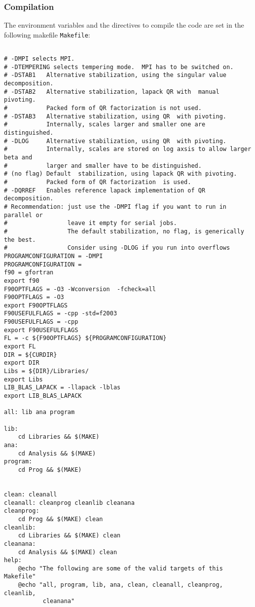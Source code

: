 \subsubsection{Compilation}
\label{sec:compilation}
%
The environment variables and the directives to compile the code are set in the following makefile \texttt{Makefile}:
\lstset{style=bash}
\begin{lstlisting}

# -DMPI selects MPI.
# -DTEMPERING selects tempering mode.  MPI has to be switched on.
# -DSTAB1   Alternative stabilization, using the singular value decomposition.
# -DSTAB2   Alternative stabilization, lapack QR with  manual pivoting.
#           Packed form of QR factorization is not used.
# -DSTAB3   Alternative stabilization, using QR  with pivoting.
#           Internally, scales larger and smaller one are distinguished.
# -DLOG     Alternative stabilization, using QR  with pivoting.
#           Internally, scales are stored on log axsis to allow larger beta and
#           larger and smaller have to be distinguished.
# (no flag) Default  stabilization, using lapack QR with pivoting. 
#           Packed form of QR factorization  is used. 
# -DQRREF   Enables reference lapack implementation of QR decomposition.
# Recommendation: just use the -DMPI flag if you want to run in parallel or 
#                 leave it empty for serial jobs.  
#                 The default stabilization, no flag, is generically the best. 
#                 Consider using -DLOG if you run into overflows
PROGRAMCONFIGURATION = -DMPI 
PROGRAMCONFIGURATION = 
f90 = gfortran
export f90
F90OPTFLAGS = -O3 -Wconversion  -fcheck=all
F90OPTFLAGS = -O3
export F90OPTFLAGS
F90USEFULFLAGS = -cpp -std=f2003
F90USEFULFLAGS = -cpp
export F90USEFULFLAGS
FL = -c ${F90OPTFLAGS} ${PROGRAMCONFIGURATION}
export FL
DIR = ${CURDIR}
export DIR
Libs = ${DIR}/Libraries/
export Libs
LIB_BLAS_LAPACK = -llapack -lblas
export LIB_BLAS_LAPACK

all: lib ana program

lib:
	cd Libraries && $(MAKE)
ana:
	cd Analysis && $(MAKE)
program:
	cd Prog && $(MAKE)


clean: cleanall
cleanall: cleanprog cleanlib cleanana
cleanprog:
	cd Prog && $(MAKE) clean
cleanlib:
	cd Libraries && $(MAKE) clean
cleanana:
	cd Analysis && $(MAKE) clean
help:
	@echo "The following are some of the valid targets of this Makefile"
	@echo "all, program, lib, ana, clean, cleanall, cleanprog, cleanlib,
	       cleanana"

\end{lstlisting}
